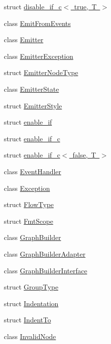 \begin{DoxyCompactItemize}
struct \mbox{\hyperlink{struct_y_a_m_l_1_1disable__if__c_3_01true_00_01_t_01_4}{disable\+\_\+if\+\_\+c$<$ true, T $>$}}
\item 
class \mbox{\hyperlink{class_y_a_m_l_1_1_emit_from_events}{Emit\+From\+Events}}
\item 
class \mbox{\hyperlink{class_y_a_m_l_1_1_emitter}{Emitter}}
\item 
class \mbox{\hyperlink{class_y_a_m_l_1_1_emitter_exception}{Emitter\+Exception}}
\item 
struct \mbox{\hyperlink{struct_y_a_m_l_1_1_emitter_node_type}{Emitter\+Node\+Type}}
\item 
class \mbox{\hyperlink{class_y_a_m_l_1_1_emitter_state}{Emitter\+State}}
\item 
struct \mbox{\hyperlink{struct_y_a_m_l_1_1_emitter_style}{Emitter\+Style}}
\item 
struct \mbox{\hyperlink{struct_y_a_m_l_1_1enable__if}{enable\+\_\+if}}
\item 
struct \mbox{\hyperlink{struct_y_a_m_l_1_1enable__if__c}{enable\+\_\+if\+\_\+c}}
\item 
struct \mbox{\hyperlink{struct_y_a_m_l_1_1enable__if__c_3_01false_00_01_t_01_4}{enable\+\_\+if\+\_\+c$<$ false, T $>$}}
\item 
class \mbox{\hyperlink{class_y_a_m_l_1_1_event_handler}{Event\+Handler}}
\item 
class \mbox{\hyperlink{class_y_a_m_l_1_1_exception}{Exception}}
\item 
struct \mbox{\hyperlink{struct_y_a_m_l_1_1_flow_type}{Flow\+Type}}
\item 
struct \mbox{\hyperlink{struct_y_a_m_l_1_1_fmt_scope}{Fmt\+Scope}}
\item 
class \mbox{\hyperlink{class_y_a_m_l_1_1_graph_builder}{Graph\+Builder}}
\item 
class \mbox{\hyperlink{class_y_a_m_l_1_1_graph_builder_adapter}{Graph\+Builder\+Adapter}}
\item 
class \mbox{\hyperlink{class_y_a_m_l_1_1_graph_builder_interface}{Graph\+Builder\+Interface}}
\item 
struct \mbox{\hyperlink{struct_y_a_m_l_1_1_group_type}{Group\+Type}}
\item 
struct \mbox{\hyperlink{struct_y_a_m_l_1_1_indentation}{Indentation}}
\item 
struct \mbox{\hyperlink{struct_y_a_m_l_1_1_indent_to}{Indent\+To}}
\item 
class \mbox{\hyperlink{class_y_a_m_l_1_1_invalid_node}{Invalid\+Node}}
\item 

\end{DoxyCompactItemize}
